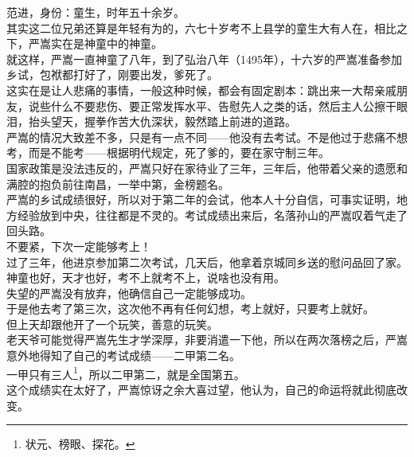 \begin{multicols}{\theparacolNo}
范进，身份：童生，时年五十余岁。\\

其实这二位兄弟还算是年轻有为的，六七十岁考不上县学的童生大有人在，相比之下，严嵩实在是神童中的神童。\\

就这样，严嵩一直神童了八年，到了弘治八年（1495年），十六岁的严嵩准备参加乡试，包袱都打好了，刚要出发，爹死了。\\

这实在是让人悲痛的事情，一般这种时候，都会有固定剧本：跳出来一大帮亲戚朋友，说些什么不要悲伤、要正常发挥水平、告慰先人之类的话，然后主人公擦干眼泪，抬头望天，握拳作苦大仇深状，毅然踏上前进的道路。\\

严嵩的情况大致差不多，只是有一点不同——他没有去考试。不是他过于悲痛不想考，而是不能考——根据明代规定，死了爹的，要在家守制三年。\\

国家政策是没法违反的，严嵩只好在家待业了三年，三年后，他带着父亲的遗愿和满腔的抱负前往南昌，一举中第，金榜题名。\\

严嵩的乡试成绩很好，所以对于第二年的会试，他本人十分自信，可事实证明，地方经验放到中央，往往都是不灵的。考试成绩出来后，名落孙山的严嵩叹着气走了回头路。\\

不要紧，下次一定能够考上！\\

过了三年，他进京参加第二次考试，几天后，他拿着京城同乡送的慰问品回了家。\\

神童也好，天才也好，考不上就考不上，说啥也没有用。\\

失望的严嵩没有放弃，他确信自己一定能够成功。\\

于是他去考了第三次，这次他不再有任何幻想，考上就好，只要考上就好。\\

但上天却跟他开了一个玩笑，善意的玩笑。\\

老天爷可能觉得严嵩先生才学深厚，非要消遣一下他，所以在两次落榜之后，严嵩意外地得知了自己的考试成绩——二甲第二名。\\

一甲只有三人\footnote{状元、榜眼、探花。}，所以二甲第二，就是全国第五。\\

这个成绩实在太好了，严嵩惊讶之余大喜过望，他认为，自己的命运将就此彻底改变。\\


\end{multicols}
